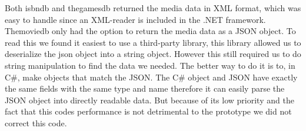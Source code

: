 Both isbndb and thegamesdb returned the media data in XML format, which was easy to handle since an XML-reader is included in the .NET framework. Themoviedb only had the option to return the media data as a JSON object. To read this we found it easiest to use a third-party library\cite{jamesJson}, this library allowed us to deserialize the json object into a string object. However this still required us to do string manipulation to find the data we needed. The better way to do it is to, in C\#, make objects that match the JSON. The C\# object and JSON have exactly the same fields with the same type and name therefore it can easily parse the JSON object into directly readable data. But because of its low priority and the fact that this codes performance is not detrimental to the prototype we did not correct this code.




